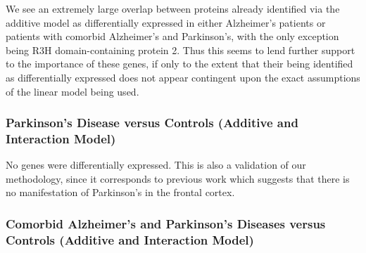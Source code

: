 We see an extremely large overlap between proteins already identified via the additive model as differentially expressed in either Alzheimer's patients or patients with comorbid Alzheimer's and Parkinson's, with the only exception being R3H domain-containing protein 2. Thus this seems to lend further support to the importance of these genes, if only to the extent that their being identified as differentially expressed does not appear contingent upon the exact assumptions of the linear model being used.\\


\subsubsection{Parkinson's Disease versus Controls (Additive and Interaction Model)}

No genes were differentially expressed. This is also a validation of our methodology, since it corresponds to previous work which suggests that there is no manifestation of Parkinson's in the frontal cortex.

\subsubsection{Comorbid Alzheimer's and Parkinson's Diseases versus Controls (Additive and Interaction Model)}
\label{adpd}

